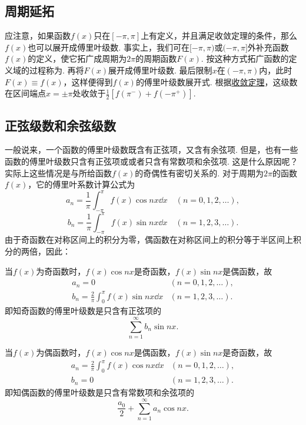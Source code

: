 \subsection{周期延拓}
应注意，如果函数\(f(x)\)只在\([-\pi,\pi]\)上有定义，并且满足收敛定理的条件，那么\(f(x)\)也可以展开成傅里叶级数.
事实上，我们可在\([-\pi,\pi)\)或\((-\pi,\pi]\)外补充函数\(f(x)\)的定义，使它拓广成周期为\(2\pi\)的周期函数\(F(x)\).
按这种方式拓广函数的定义域的过程称为.
再将\(F(x)\)展开成傅里叶级数.
最后限制\(x\)在\((-\pi,\pi)\)内，此时\(F(x) \equiv f(x)\)，这样便得到\(f(x)\)的傅里叶级数展开式.
根据\hyperref[theorem:无穷级数.傅里叶级数收敛的狄利克雷充分条件]{收敛定理}，这级数在区间端点\(x=\pm\pi\)处收敛于\(\frac{1}{2} [f(\pi^-) + f(-\pi^+)]\).

\subsection{正弦级数和余弦级数}
一般说来，一个函数的傅里叶级数既含有正弦项，又含有余弦项.
但是，也有一些函数的傅里叶级数只含有正弦项或或者只含有常数项和余弦项.
这是什么原因呢？实际上这些情况是与所给函数\(f(x)\)的奇偶性有密切关系的.
对于周期为\(2\pi\)的函数\(f(x)\)，它的傅里叶系数计算公式为\[
a_n = \frac{1}{\pi} \int_{-\pi}^\pi f(x) \cos nx \dd{x} \quad(n=0,1,2,\dotsc),
\]\[
b_n = \frac{1}{\pi} \int_{-\pi}^\pi f(x) \sin nx \dd{x} \quad(n=1,2,3,\dotsc).
\]
由于奇函数在对称区间上的积分为零，偶函数在对称区间上的积分等于半区间上积分的两倍，因此：

当\(f(x)\)为奇函数时，\(f(x) \cos nx\)是奇函数，\(f(x) \sin nx\)是偶函数，故\[
\begin{array}{ll}
a_n = 0 & (n=0,1,2,\dotsc), \\
b_n = \frac{2}{\pi} \int_0^\pi f(x) \sin nx \dd{x} & (n=1,2,3,\dotsc).
\end{array}
\]即知奇函数的傅里叶级数是只含有正弦项的\[
\sum\limits_{n=1}^\infty b_n \sin nx.
\]

当\(f(x)\)为偶函数时，\(f(x) \cos nx\)是偶函数，\(f(x) \sin nx\)是奇函数，故\[
\begin{array}{ll}
a_n = \frac{2}{\pi} \int_0^\pi f(x) \cos nx \dd{x} & (n=0,1,2,\dotsc), \\
b_n = 0 & (n=1,2,3,\dotsc).
\end{array}
\]即知偶函数的傅里叶级数是只含有常数项和余弦项的\[
\frac{a_0}{2} + \sum\limits_{n=1}^\infty a_n \cos{nx}.
\]

